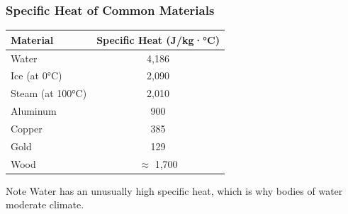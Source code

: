 \documentclass{beamer}
\begin{document}
\begin{frame}
    \frametitle{Specific Heat of Common Materials}
    \begin{center}
        \begin{tabular}{|l|c|}
            \hline
            \textbf{Material} & \textbf{Specific Heat (J/kg·°C)} \\
            \hline
            Water & 4,186 \\
            \hline
            Ice (at 0°C) & 2,090 \\
            \hline
            Steam (at 100°C) & 2,010 \\
            \hline
            Aluminum & 900 \\
            \hline
            Copper & 385 \\
            \hline
            Gold & 129 \\
            \hline
            Wood & $\approx$ 1,700 \\
            \hline
        \end{tabular}
    \end{center}
    
    \begin{block}{Note}
        Water has an unusually high specific heat, which is why bodies of water moderate climate.
    \end{block}
\end{frame}
\end{document}
